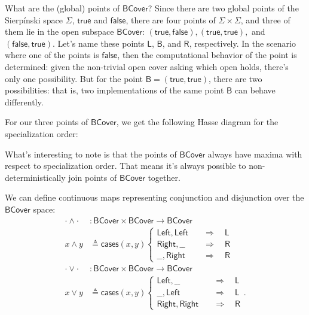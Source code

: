 \documentclass[conference]{IEEEtran}
\newcommand{\Branch}{\Rightarrow}
\begin{document}
What are the (global) points of $\mathsf{BCover}$? Since there are two global points of the Sierp\'inski space $\Sigma$, $\mathsf{true}$ and $\mathsf{false}$, there are four points of $\Sigma \times \Sigma$, and three of them lie in the open subspace $\mathsf{BCover}$: $(\mathsf{true}, \mathsf{false}), (\mathsf{true}, \mathsf{true}),$ and $(\mathsf{false}, \mathsf{true})$. Let's name these points $\mathsf{L}$, $\mathsf{B}$, and $\mathsf{R}$, respectively. In the scenario where one of the points is $\mathsf{false}$, then the computational behavior of the point is determined: given the non-trivial open cover asking which open holds, there's only one possibility. But for the point $\mathsf{B} = (\mathsf{true}, \mathsf{true})$, there are two possibilities: that is, two implementations of the same point $\mathsf{B}$ can behave differently.

For our three points of $\mathsf{BCover}$, we get the following Hasse diagram for the specialization order:
\begin{center}
\end{center}

What's interesting to note is that the points of $\mathsf{BCover}$ always have maxima with respect to specialization order. That means it's always possible to non-deterministically join points of $\mathsf{BCover}$ together.

We can define continuous maps representing conjunction and disjunction over the $\mathsf{BCover}$ space:
\begin{align*}
\cdot \wedge \cdot &: \mathsf{BCover} \times \mathsf{BCover} \to \mathsf{BCover}
\\ x \wedge y &\triangleq \mathsf{cases}(x, y)
\begin{cases}
\mathsf{Left}, \mathsf{Left}
 \quad &\Branch \quad
 \mathsf{L}
\\
\mathsf{Right}, \_\_
 \quad &\Branch \quad
 \mathsf{R}
\\
\_\_, \mathsf{Right}
 \quad &\Branch \quad
 \mathsf{R}
\end{cases}
\\
\cdot \vee \cdot &: \mathsf{BCover} \times \mathsf{BCover} \to \mathsf{BCover}
\\ x \vee y &\triangleq \mathsf{cases}(x, y)
\begin{cases}
\mathsf{Left}, \_\_
 \quad &\Branch \quad
 \mathsf{L}
\\
\_\_, \mathsf{Left}
 \quad &\Branch \quad
 \mathsf{L}
\\
 \mathsf{Right}, \mathsf{Right}
 \quad &\Branch \quad
 \mathsf{R}
\end{cases}.
\end{align*}
\end{document}
